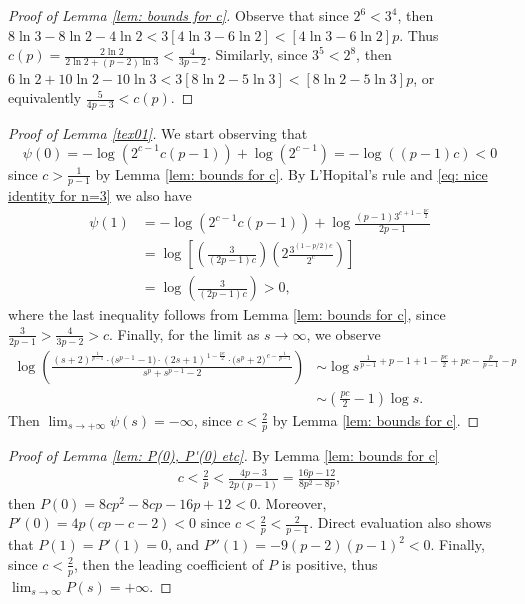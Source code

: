 \documentclass[11pt]{article}
\theoremstyle{definition}
\newcommand{\1}{\mathbf{1}}
\begin{document}
\begin{proof}[Proof of Lemma \ref{lem: bounds for c}]
Observe that since $2^6<3^4$, then
$8\ln 3-8\ln 2-4\ln 2<3[4\ln 3-6\ln 2]<[4\ln 3-6\ln 2]p$. Thus $c(p)=\frac{2\ln 2}{2\ln 2+(p-2)\ln 3}< \frac{4}{3p-2}$. Similarly, since $3^5<2^8$, then $6\ln 2+10\ln 2-10\ln 3<3[8\ln 2-5\ln 3]<[8\ln 2-5\ln 3]p$, or equivalently $\frac{5}{4p-3}<c(p)$.
\end{proof}


\begin{proof}[Proof of Lemma \ref{tex01}]
We start observing that 
\begin{equation}
    \psi(0)=-\log(2^{c-1}c(p-1))+\log(2^{c-1})=-\log((p-1)c)<0
\end{equation}
since $c>\frac{1}{p-1}$ by Lemma \ref{lem: bounds for c}. By L'Hopital's rule and \eqref{eq: nice identity for n=3} we also have
\begin{align*}
 \psi(1)&=-\log(2^{c-1}c(p-1))+\log\frac{(p-1)3^{c+1-\frac{pc}{2}}}{2p-1}\\
 &=\log\left[\left(\frac{3}{(2p-1)c}\right)\left(2\frac{3^{(1-p/2)c}}{2^c}\right)\right]\\
 &=\log\left(\frac{3}{(2p-1)c}\right)>0,
\end{align*}
where the last inequality follows from Lemma \ref{lem: bounds for c}, since $\frac{3}{2p-1}>\frac{4}{3p-2}>c$. Finally, for the limit as $s \to \infty$, we observe
\begin{align*}
    \log\left(\frac{(s+2)^{\frac{1}{p-1}}\cdot\bigl(s^{p-1}-1\bigr)\cdot(2s+1)^{\,1-\frac{pc}{2}}\cdot\bigl(s^{p}+2\bigr)^{\,c-\frac{1}{p-1}}}{s^{p}+s^{p-1}-2} \right)&\sim\log s^{\frac{1}{p-1}+p-1+1-\frac{pc}{2}+pc-\frac{p}{p-1}-p}\\
    &\sim\left(\frac{pc}{2}-1\right)\log s.
\end{align*}
Then $\lim_{s \to +\infty} \psi(s) =-\infty$, since $c<\frac{2}{p}$ by Lemma \ref{lem: bounds for c}.
\end{proof}

\begin{proof}[Proof of Lemma \ref{lem: P(0), P'(0) etc}]
By Lemma \ref{lem: bounds for c}
\begin{align*}
c<\frac{2}{p}<\frac{4p-3}{2p(p-1)}=\frac{16p-12}{8p^2-8p},    
\end{align*}
then $P(0)=8cp^{2}-8cp-16p+12<0$. Moreover, $P'(0)=4p(cp-c-2)<0$ since $c<\frac{2}{p}<\frac{2}{p-1}$. Direct evaluation also shows that $P(1)=P'(1)=0$, and $P''(1)=-9(p-2)(p-1)^2<0$. Finally, since $c<\frac{2}{p}$, then the leading coefficient of $P$ is positive, thus $\lim_{s \to \infty} P(s)=+\infty$.
\end{proof}
\end{document}
